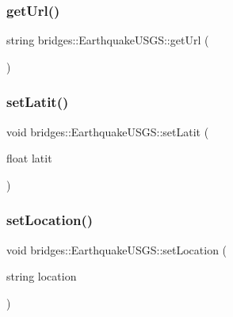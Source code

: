 \subsubsection{\texorpdfstring{get\+Url()}{getUrl()}}
{\footnotesize\ttfamily string bridges\+::\+Earthquake\+U\+S\+G\+S\+::get\+Url (\begin{DoxyParamCaption}{ }\end{DoxyParamCaption})\hspace{0.3cm}{\ttfamily [inline]}}

\hypertarget{classbridges_1_1_earthquake_u_s_g_s_a143678bb9dd697f82dcb260ddab78f82}{}\label{classbridges_1_1_earthquake_u_s_g_s_a143678bb9dd697f82dcb260ddab78f82} 
\subsubsection{\texorpdfstring{set\+Latit()}{setLatit()}}
{\footnotesize\ttfamily void bridges\+::\+Earthquake\+U\+S\+G\+S\+::set\+Latit (\begin{DoxyParamCaption}\item[{float}]{latit }\end{DoxyParamCaption})\hspace{0.3cm}{\ttfamily [inline]}}

\hypertarget{classbridges_1_1_earthquake_u_s_g_s_a5dc533759cc900440d70bdfc68f16599}{}\label{classbridges_1_1_earthquake_u_s_g_s_a5dc533759cc900440d70bdfc68f16599} 
\subsubsection{\texorpdfstring{set\+Location()}{setLocation()}}
{\footnotesize\ttfamily void bridges\+::\+Earthquake\+U\+S\+G\+S\+::set\+Location (\begin{DoxyParamCaption}\item[{string}]{location }\end{DoxyParamCaption})\hspace{0.3cm}{\ttfamily [inline]}}

\hypertarget{classbridges_1_1_earthquake_u_s_g_s_a745dc27f3c68a3ae996ceb7771d89ec5}{}\label{classbridges_1_1_earthquake_u_s_g_s_a745dc27f3c68a3ae996ceb7771d89ec5} 
